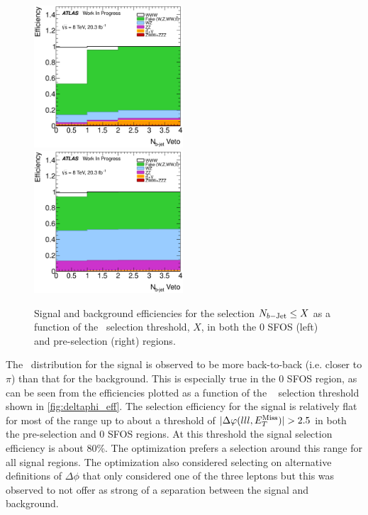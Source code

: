 \begin{figure}[ht!]
\centering
\includegraphics[width=0.495\textwidth]{figures/optimization/SignalRegionsPreselection_0SFOS_Efficiencies/NBTaggedJets_LeftCumulative.eps}
\includegraphics[width=0.495\textwidth]{figures/optimization/SignalRegions_0p5mmZ0_Preselection_Efficiencies/NBTaggedJets_LeftCumulative.eps}
\caption{ Signal and background efficiencies 
for the selection
$N_{b-\textrm{Jet}} \leq X$
as a function of the \nbjet~selection
threshold, $X$, in both the 0 SFOS (left) and pre-selection (right) regions.  }
\label{fig:nbjet_eff}
\end{figure}


The \deltaphi~distribution for the signal is observed to be more back-to-back
(i.e. closer to $\pi$)
than that for the background. This is especially true in the 0 SFOS
region, as can be seen from the efficiencies plotted 
as a function of the \deltaphi~
selection threshold shown in \fig\ref{fig:deltaphi_eff}.
The selection efficiency for the signal is relatively flat for
most of the range up to about 
a threshold of $|\deltaphi|>2.5$ in both the pre-selection and 0 SFOS
regions.  At this threshold the signal selection efficiency 
is about 80\%.  The optimization prefers a selection
around this range for all signal regions.
The optimization also considered selecting on alternative
definitions of $\Delta\phi$ that only considered one of the three
leptons but this was observed to not offer as strong of a separation
between the signal and background. %

